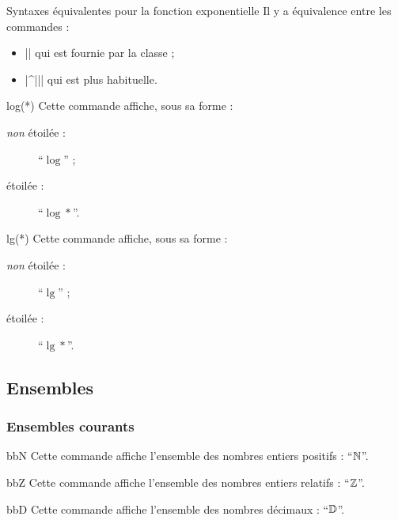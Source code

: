 \documentclass[french,nolocaltoc]{nwejmart}
\newtheorem[style=definition]{fait}
\newtheorem[title=expérience]{experience}
\newtheorem[title-plural=anneaux]{anneau}
\newtheorem[title=idéal,title-plural=idéaux]{ideal}
\begin{document}
\begin{dbremark}{Syntaxes équivalentes pour la fonction exponentielle}{}
  Il y a équivalence entre les commandes :
  \begin{itemize}
  \item || qui est fournie par la classe ;
  \item |\E^{||}| qui est plus habituelle.
\end{itemize}
\end{dbremark}

\begin{docCommand}{log(*)}{}
  Cette commande affiche, sous sa forme :
  \begin{description}
  \item[\emph{non} étoilée :] \enquote{$\log$} ;
  \item[étoilée :] \enquote{$\log*$}.
  \end{description}
\end{docCommand}

\begin{docCommand}{lg(*)}{}
  Cette commande affiche, sous sa forme :
  \begin{description}
  \item[\emph{non} étoilée :] \enquote{$\lg$} ;
  \item[étoilée :] \enquote{$\lg*$}.
  \end{description}
\end{docCommand}

\subsection{Ensembles}

\subsubsection{Ensembles courants}

\begin{docCommand}{bbN}{}
  Cette commande affiche l'ensemble des nombres entiers positifs :
  \enquote{$\mathbb{N}$}.
\end{docCommand}

\begin{docCommand}{bbZ}{}
  Cette commande affiche l'ensemble des nombres entiers relatifs :
  \enquote{$\mathbb{Z}$}.
\end{docCommand}

\begin{docCommand}{bbD}{}
  Cette commande affiche l'ensemble des nombres décimaux : \enquote{$\mathbb{D}$}.
\end{docCommand}
\end{document}

